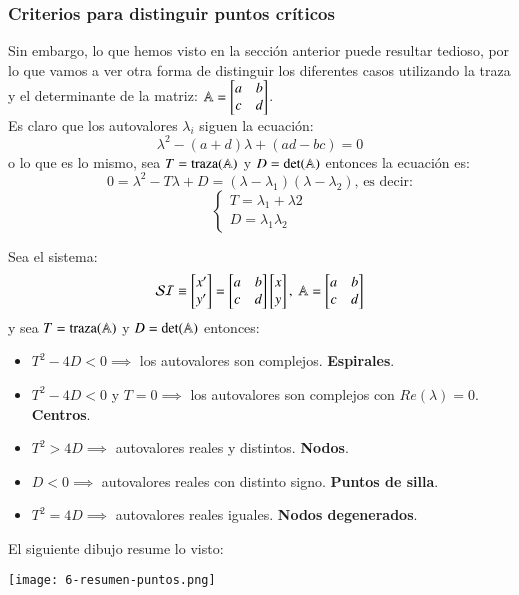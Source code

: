 \subsubsection{Criterios para distinguir puntos cr\'iticos}
Sin embargo, lo que hemos visto en la sección anterior puede resultar tedioso, por lo que vamos a ver otra forma de distinguir los diferentes casos utilizando la traza y el determinante de la matriz: $\A = \mx{a & b \\ c & d}$.\\
Es claro que los autovalores $\lambda_i$ siguen la ecuación:
$$
    \lambda^2 - (a+d) \lambda + (ad - bc) = 0
$$
o lo que es lo mismo, sea $T = \mathrm{traza}(\mathbb{A})$ y $D = \mathrm{det}(\mathbb{A})$ entonces la ecuación es:
$$
    0 = \lambda^2 - T\lambda + D = (\lambda - \lambda_1)(\lambda - \lambda_2)\text{, es decir:}
$$
$$
    \begin{cases}
        T = \lambda_1 + \lambda 2\\
        D = \lambda_1 \lambda_2
    \end{cases}
$$
\begin{pro}
    Sea el sistema:
    $$
        \mathcal{SI} \equiv \mx{x'\\y'} = \mx{a & b\\ c & d} \mx{x \\ y},\ \A = \mx{a & b \\ c & d}
    $$
    y sea $T = \mathrm{traza}(\mathbb{A})$ y $D = \mathrm{det}(\mathbb{A})$ entonces:
    \begin{itemize}
        \item $T^2 - 4D < 0 \implies$ los autovalores son complejos. \textbf{Espirales}.
        \item $T^2 - 4D < 0$ y $T = 0 \implies$ los autovalores son complejos con $Re(\lambda) = 0$. \textbf{Centros}.
        \item $T^2 > 4D \implies$ autovalores reales y distintos. \textbf{Nodos}.
        \item $D < 0 \implies$ autovalores reales con distinto signo. \textbf{Puntos de silla}.
        \item $T^2 = 4D \implies$ autovalores reales iguales. \textbf{Nodos degenerados}.
    \end{itemize}
    El siguiente dibujo resume lo visto:
    \begin{center}
        \texttt{[image: 6-resumen-puntos.png]}
    \end{center}
\end{pro}
